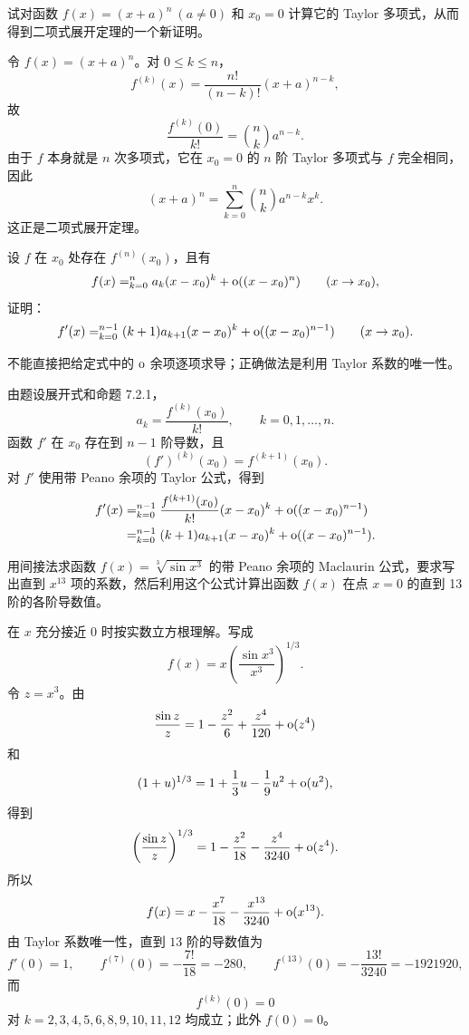 \begin{xexercise}[3]
试对函数 $f(x)=(x+a)^n\ (a\neq0)$ 和 $x_0=0$ 计算它的 Taylor 多项式，从而得到二项式展开定理的一个新证明。
\end{xexercise}
\begin{xsolution}
令 $f(x)=(x+a)^n$。对 $0\leqslant k\leqslant n$，
\[
  f^{(k)}(x)=\frac{n!}{(n-k)!}(x+a)^{n-k},
\]
故
\[
  \frac{f^{(k)}(0)}{k!}
  =\binom nk a^{n-k}.
\]
由于 $f$ 本身就是 $n$ 次多项式，它在 $x_0=0$ 的 $n$ 阶 Taylor 多项式与 $f$ 完全相同，因此
\[
  (x+a)^n
  =\sum_{k=0}^n\binom nk a^{n-k}x^k.
\]
这正是二项式展开定理。
\end{xsolution}


\begin{xexercise}[4]
设 $f$ 在 $x_0$ 处存在 $f^{(n)}(x_0)$，且有
\[
  f(x)=\relax_{k=0}^n a_k(x-x_0)^k+\mathrm{o}((x-x_0)^n)\qquad(x\to x_0),
\]
证明：
\[
  f'(x)=\relax_{k=0}^{n-1}(k+1)a_{k+1}(x-x_0)^k+\mathrm{o}((x-x_0)^{n-1})\qquad(x\to x_0).
\]
\end{xexercise}
\begin{xsolution}
不能直接把给定式中的 $\mathrm{o}$ 余项逐项求导；正确做法是利用 Taylor 系数的唯一性。

由题设展开式和命题 7.2.1，
\[
  a_k=\frac{f^{(k)}(x_0)}{k!},
  \qquad k=0,1,\ldots,n.
\]
函数 $f'$ 在 $x_0$ 存在到 $n-1$ 阶导数，且
\[
  (f')^{(k)}(x_0)=f^{(k+1)}(x_0).
\]
对 $f'$ 使用带 Peano 余项的 Taylor 公式，得到
\[
  \begin{aligned}
  f'(x)
  &=\relax_{k=0}^{n-1}\frac{f^{(k+1)}(x_0)}{k!}(x-x_0)^k
    +\mathrm{o}((x-x_0)^{n-1})\\
  &=\relax_{k=0}^{n-1}(k+1)a_{k+1}(x-x_0)^k
    +\mathrm{o}((x-x_0)^{n-1}).
  \end{aligned}
\]
\end{xsolution}


\begin{xexercise}[5]
用间接法求函数 $f(x)=\sqrt[3]{\sin x^3}$ 的带 Peano 余项的 Maclaurin 公式，要求写出直到 $x^{13}$ 项的系数，然后利用这个公式计算出函数 $f(x)$ 在点 $x=0$ 的直到 13 阶的各阶导数值。
\end{xexercise}
\begin{xsolution}
在 $x$ 充分接近 $0$ 时按实数立方根理解。写成
\[
  f(x)=x\left(\frac{\sin x^3}{x^3}\right)^{1/3}.
\]
令 $z=x^3$。由
\[
  \frac{\sin z}{z}=1-\frac{z^2}{6}+\frac{z^4}{120}+\mathrm{o}(z^4)
\]
和
\[
  (1+u)^{1/3}=1+\frac13u-\frac19u^2+\mathrm{o}(u^2),
\]
得到
\[
  \left(\frac{\sin z}{z}\right)^{1/3}
  =1-\frac{z^2}{18}-\frac{z^4}{3240}+\mathrm{o}(z^4).
\]
所以
\[
  f(x)=x-\frac{x^7}{18}-\frac{x^{13}}{3240}+\mathrm{o}(x^{13}).
\]
由 Taylor 系数唯一性，直到 $13$ 阶的导数值为
\[
  f'(0)=1,
  \qquad
  f^{(7)}(0)=-\frac{7!}{18}=-280,
  \qquad
  f^{(13)}(0)=-\frac{13!}{3240}=-1921920,
\]
而
\[
  f^{(k)}(0)=0
\]
对 $k=2,3,4,5,6,8,9,10,11,12$ 均成立；此外 $f(0)=0$。
\end{xsolution}


